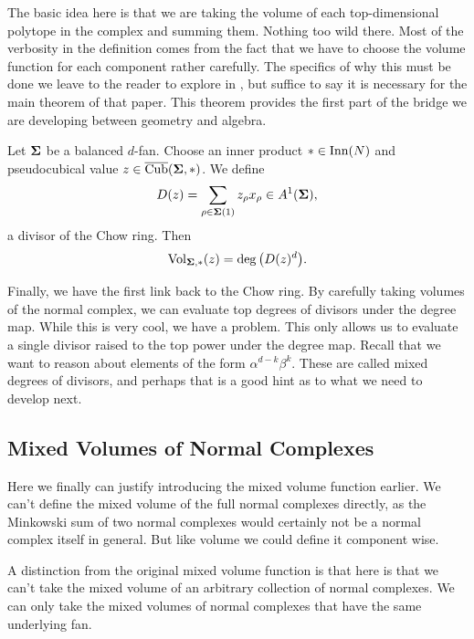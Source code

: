 \documentclass[12pt,oneside]{../../sfsuthesis}
\begin{document}
The basic idea here is that we are taking the volume of each top-dimensional polytope in the complex and summing them.
Nothing too wild there.
Most of the verbosity in the definition comes from the fact that we have to choose the volume function for each component rather carefully.
The specifics of why this must be done we leave to the reader to explore in \cite{nathansonTropicalFansNormal2023}, but suffice to say it is necessary for the main theorem of that paper.
This theorem provides the first part of the bridge we are developing between geometry and algebra.
\begin{theorem}\th\label{thm:volDegCorrespondence}
    Let \( \bm{\Sigma} \) be a balanced \( d \)-fan.
    Choose an inner product \( \ast \in \operatorname{Inn}(N) \) and pseudocubical value \( z  \in \operatorname{\overline{Cub}}( \bm{\Sigma}, \ast ) \).
    We define
    \[
        D(z) = \sum_{\rho \in \bm{\Sigma}(1)} z_\rho x_\rho \in A^1(\bm{\Sigma}),
    \]
    a divisor of the Chow ring.
    Then
    \[
        \operatorname{Vol}_{\bm{\Sigma}, \ast}(z) = \deg\big( D(z)^d \big).
    \]
\end{theorem}

Finally, we have the first link back to the Chow ring.
By carefully taking volumes of the normal complex, we can evaluate top degrees of divisors under the degree map.
While this is very cool, we have a problem.
This only allows us to evaluate a single divisor raised to the top power under the degree map.
Recall that we want to reason about elements of the form \( \alpha^{d-k}\beta^k \).
These are called mixed degrees of divisors, and perhaps that is a good hint as to what we need to develop next.

\subsection{Mixed Volumes of Normal Complexes}
Here we finally can justify introducing the mixed volume function earlier.
We can't define the mixed volume of the full normal complexes directly, as the Minkowski sum of two normal complexes would certainly not be a normal complex itself in general.
But like volume we could define it component wise.

A distinction from the original mixed volume function is that here is that we can't take the mixed volume of an arbitrary collection of normal complexes.
We can only take the mixed volumes of normal complexes that have the same underlying fan.
\end{document}

